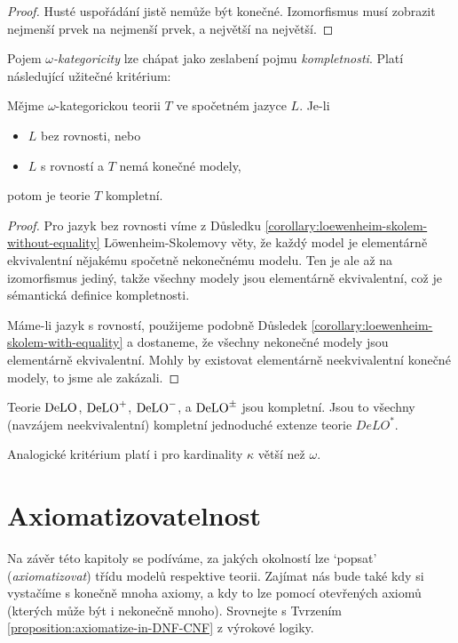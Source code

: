\begin{proof}
Husté uspořádání jistě nemůže být konečné. Izomorfismus musí zobrazit nejmenší prvek na nejmenší prvek, a největší na největší.
\end{proof}

Pojem \emph{$\omega$-kategoricity} lze chápat jako zeslabení pojmu \emph{kompletnosti}. Platí následující užitečné kritérium:

\begin{theorem}
Mějme $\omega$-kategorickou teorii $T$ ve spočetném jazyce $L$. Je-li
\begin{itemize}
    \item $L$ bez rovnosti, nebo
    \item $L$ s rovností a $T$ nemá konečné modely,
\end{itemize}
potom je teorie $T$ kompletní.
\end{theorem}
\begin{proof}
Pro jazyk bez rovnosti víme z Důsledku \ref{corollary:loewenheim-skolem-without-equality} Löwenheim-Skolemovy věty, že každý model je elementárně ekvivalentní nějakému spočetně nekonečnému modelu. Ten je ale až na izomorfismus jediný, takže všechny modely jsou elementárně ekvivalentní, což je sémantická definice kompletnosti.

Máme-li jazyk s rovností, použijeme podobně Důsledek \ref{corollary:loewenheim-skolem-with-equality} a dostaneme, že všechny nekonečné modely jsou elementárně ekvivalentní. Mohly by existovat elementárně neekvivalentní konečné modely, to jsme ale zakázali.
\end{proof}

\begin{corollary}\label{corollary:complete-simple-extensions-of-delo}
    Teorie $\operatorname{DeLO}$, $\operatorname{DeLO}^+$, $\operatorname{DeLO}^-$, a $\operatorname{DeLO}^\pm$ jsou kompletní. Jsou to všechny (navzájem neekvivalentní) kompletní jednoduché extenze teorie $DeLO^*$.
\end{corollary}

\begin{remark}
Analogické kritérium platí i pro kardinality $\kappa$ větší než $\omega$.
\end{remark}


\section{Axiomatizovatelnost}

Na závěr této kapitoly se podíváme, za jakých okolností lze `popsat' (\emph{axiomatizovat}) třídu modelů respektive teorii. Zajímat nás bude také kdy si vystačíme s konečně mnoha axiomy, a kdy to lze pomocí otevřených axiomů (kterých může být i nekonečně mnoho). Srovnejte s Tvrzením \ref{proposition:axiomatize-in-DNF-CNF} z výrokové logiky. 

